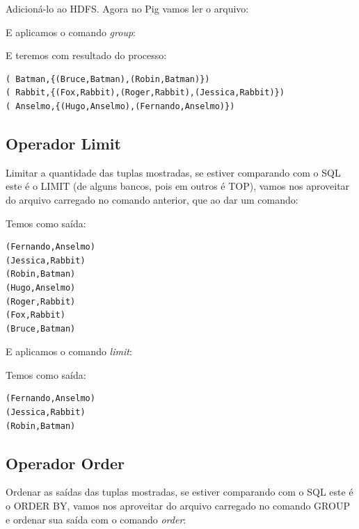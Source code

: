 \documentclass[a4paper,11pt]{article}
\begin{document}
Adicioná-lo ao HDFS. Agora no Pig vamos ler o arquivo: \\

E aplicamos o comando \textit{group}: \\

E teremos com resultado do processo:
\begin{lstlisting}[]
( Batman,{(Bruce,Batman),(Robin,Batman)})
( Rabbit,{(Fox,Rabbit),(Roger,Rabbit),(Jessica,Rabbit)})
( Anselmo,{(Hugo,Anselmo),(Fernando,Anselmo)})
\end{lstlisting}

\subsection{Operador Limit}
Limitar a quantidade das tuplas mostradas, se estiver comparando com o SQL este é o LIMIT (de alguns bancos, pois em outros é TOP), vamos nos aproveitar do arquivo carregado no comando anterior, que ao dar um comando: \\

Temos como saída:
\begin{lstlisting}[]
(Fernando,Anselmo)
(Jessica,Rabbit)
(Robin,Batman)
(Hugo,Anselmo)
(Roger,Rabbit)
(Fox,Rabbit)
(Bruce,Batman)
\end{lstlisting}

E aplicamos o comando \textit{limit}: \\

Temos como saída:
\begin{lstlisting}[]
(Fernando,Anselmo)
(Jessica,Rabbit)
(Robin,Batman)
\end{lstlisting}

\subsection{Operador Order}
Ordenar as saídas das tuplas mostradas, se estiver comparando com o SQL este é o ORDER BY, vamos nos aproveitar do arquivo carregado no comando GROUP e ordenar sua saída com o comando \textit{order}: \\
\end{document}
